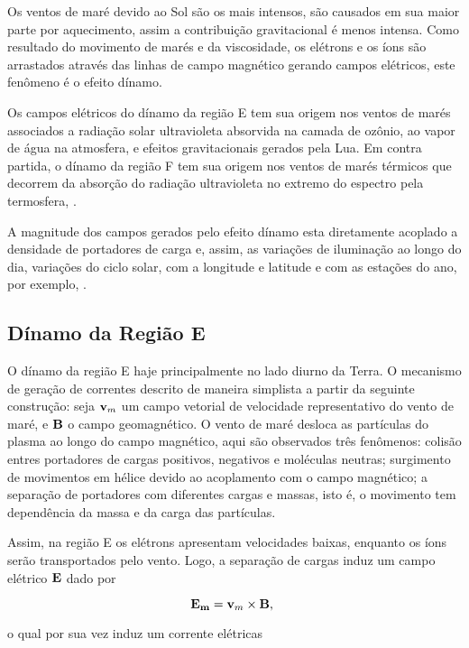 Os ventos de maré devido ao Sol são os mais intensos, são causados em sua maior parte por aquecimento, assim a contribuição gravitacional é menos intensa. Como resultado do movimento de marés e da viscosidade, os elétrons e os íons são arrastados através das linhas de campo magnético gerando campos elétricos, este fenômeno é o efeito dínamo.

Os campos elétricos do dínamo da região E tem sua origem nos ventos de marés associados a radiação solar ultravioleta absorvida na camada de ozônio, ao vapor de água na atmosfera, e efeitos gravitacionais gerados pela Lua. Em contra partida, o dínamo da região F tem sua origem nos ventos de marés térmicos que decorrem da absorção do radiação ultravioleta no extremo do espectro pela termosfera, \cite{ABDU:2005}.

A magnitude dos campos gerados pelo efeito dínamo esta diretamente acoplado a densidade  de portadores de carga e, assim, as variações de iluminação ao longo do dia, variações do ciclo solar, com a longitude e latitude e com as estações do ano, por exemplo, \cite{FEJER:1999}.

\subsection{Dínamo da Região E} 

O dínamo da região E haje principalmente no lado diurno da Terra. O mecanismo de geração de correntes descrito de maneira simplista a partir da seguinte construção: seja ${\bf v}_m$ um campo vetorial de velocidade representativo do vento de maré, e ${\bf B}$ o campo geomagnético. O vento de maré desloca as partículas do plasma ao longo do campo magnético, aqui são observados três fenômenos: colisão entres portadores de cargas positivos, negativos e moléculas neutras; surgimento de movimentos em hélice devido ao acoplamento com o campo magnético; a separação de portadores com diferentes cargas e massas, isto é, o movimento tem dependência da massa e da carga das partículas.

Assim, na região E os elétrons apresentam velocidades baixas, enquanto os íons serão transportados pelo vento. Logo, a separação de cargas induz um campo elétrico ${\bf E}$ dado por 

\begin{equation}
{\bf E_m} = {\bf v}_m\times{\bf B}\mbox{,}~
\end{equation}

o qual por sua vez induz um corrente elétricas

